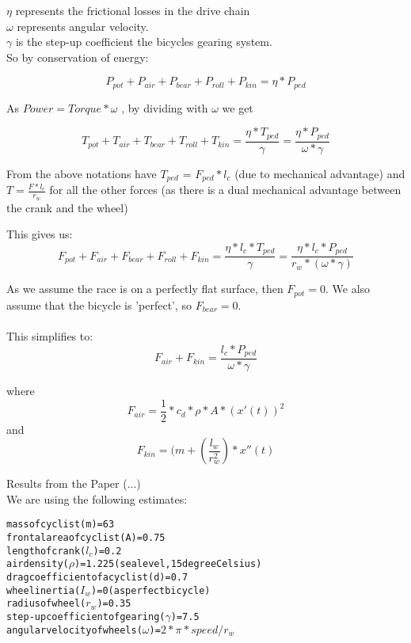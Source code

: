 \documentclass[10pt, a4paper]{report}
\begin{document}
\vspace*{1cm}

$\eta$ 		represents the frictional losses in the drive chain \\
$\omega$ 	represents angular velocity.\\
$\gamma$	is the step-up coefficient the bicycles gearing system.  \\

So by conservation of energy:

$$P_{pot} + P_{air} + P_{bear} + P_{roll} + P_{kin} = \eta * P_{ped}$$

As $Power = Torque * \omega$ , by dividing with $\omega$ we get

$$ T_{pot} + T_{air} + T_{bear} + T_{roll} + T_{kin} = \frac{ \eta * T_{ped} }{ \gamma }  = \frac{\eta * P_{ped}}{\omega * \gamma} $$

From the above notations have $T_{ped}$ = $F_{ped} * l_{c}$ (due to mechanical advantage) and $T = \frac{F * l_{c}}{r_{w}}$ for all the other forces (as there is a dual mechanical advantage between the crank and the wheel)

This gives us: $$ F_{pot} + F_{air} + F_{bear} + F_{roll} + F_{kin}
	= \frac{ \eta * l_{c} * T_{ped} }{ \gamma }
	= \frac{ \eta * l_{c} * P_{ped} }{ r_{w} * (\omega * \gamma)} $$

As we assume the race is on a perfectly flat surface, then $F_{pot} = 0$. We also assume that the bicycle is 'perfect', so $F_{bear} = 0$. \\\\
This simplifies to: $$F_{air} + F_{kin} = \frac{l_{c} * P_{ped} }{ \omega * \gamma } $$

where $$ F_{air} 	= \frac{1}{2} * c_{d} * \rho * A * ( x'(t) )^{2} $$
and	  $$ F_{kin} 	= ( m + ( \frac{l_w}{r_w^{2}} ) * x''(t) $$

Results from the Paper (...)\\

We are using the following estimates:

\begin{alltt}
mass of cyclist (m) 				= 63
frontal area of cyclist (A) 		= 0.75
length of crank (\(l_{c}\)) 		= 0.2
air density (\(\rho\)) 				= 1.225 (sea level, 15 degree Celsius)
drag coefficient of a cyclist (d) 	= 0.7
wheel inertia (\(I_w\)) = 0 (as perfect bicycle)
radius of wheel (\(r_w\)) = 0.35
step-up coefficient of gearing (\(\gamma\)) = 7.5
angular velocity of wheels (\(\omega\)) = \(2 * \pi * speed / {r_{w}} \)
\end{alltt}
\end{document}
